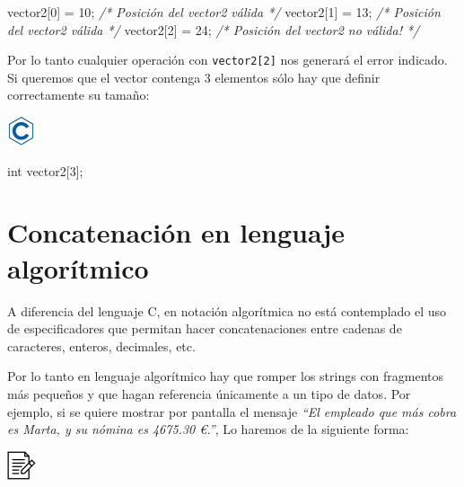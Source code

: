 \documentclass[
]{book}
\newenvironment{Shaded}{\begin{snugshade}}{\end{snugshade}}
\newcommand{\CommentTok}[1]{\textcolor[rgb]{0.56,0.35,0.01}{\textit{#1}}}
\newcommand{\DataTypeTok}[1]{\textcolor[rgb]{0.13,0.29,0.53}{#1}}
\newcommand{\DecValTok}[1]{\textcolor[rgb]{0.00,0.00,0.81}{#1}}
\newcommand{\NormalTok}[1]{#1}
\begin{document}
\begin{Shaded}
\begin{Highlighting}[]
\NormalTok{vector2[}\DecValTok{0}\NormalTok{] = }\DecValTok{10}\NormalTok{;  }\CommentTok{/* Posición del vector2 válida */}
\NormalTok{vector2[}\DecValTok{1}\NormalTok{] = }\DecValTok{13}\NormalTok{;  }\CommentTok{/* Posición del vector2 válida */}
\NormalTok{vector2[}\DecValTok{2}\NormalTok{] = }\DecValTok{24}\NormalTok{;  }\CommentTok{/* Posición del vector2 no válida! */}
\end{Highlighting}
\end{Shaded}

Por lo tanto cualquier operación con \texttt{vector2{[}2{]}} nos generará el error indicado. Si queremos que el vector contenga 3 elementos sólo hay que definir correctamente su tamaño:

\includegraphics{./img/c.png}

\begin{Shaded}
\begin{Highlighting}[]
\DataTypeTok{int}\NormalTok{ vector2[}\DecValTok{3}\NormalTok{];}
\end{Highlighting}
\end{Shaded}

\hypertarget{concatenaciuxf3n-en-lenguaje-algoruxedtmico}{%
\section{Concatenación en lenguaje algorítmico}\label{concatenaciuxf3n-en-lenguaje-algoruxedtmico}}

A diferencia del lenguaje C, en notación algorítmica no está contemplado el uso de especificadores que permitan hacer concatenaciones entre cadenas de caracteres, enteros, decimales, etc.

Por lo tanto en lenguaje algorítmico hay que romper los strings con fragmentos más pequeños y que hagan referencia únicamente a un tipo de datos. Por ejemplo, si se quiere mostrar por pantalla el mensaje \emph{``El empleado que más cobra es Marta, y su nómina es 4675.30 €.''}, Lo haremos de la siguiente forma:

\includegraphics{./img/alg.png}
\end{document}
